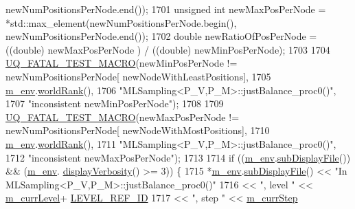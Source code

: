 \begin{DoxyCode}
      newNumPositionsPerNode.end());
1701     \textcolor{keywordtype}{unsigned} \textcolor{keywordtype}{int} newMaxPosPerNode = *std::max\_element(newNumPositionsPerNode.begin(), 
      newNumPositionsPerNode.end());
1702     \textcolor{keywordtype}{double} newRatioOfPosPerNode = ((double) newMaxPosPerNode ) / ((double) newMinPosPerNode);
1703 
1704     \hyperlink{_defines_8h_a56d63d18d0a6d45757de47fcc06f574d}{UQ\_FATAL\_TEST\_MACRO}(newMinPosPerNode != newNumPositionsPerNode[
      newNodeWithLeastPositions],
1705                         \hyperlink{class_q_u_e_s_o_1_1_m_l_sampling_a13f1ca4fe9f94822fe572a743eaced1d}{m\_env}.\hyperlink{class_q_u_e_s_o_1_1_base_environment_a78b57112bbd0e6dd0e8afec00b40ffa7}{worldRank}(),
1706                         \textcolor{stringliteral}{"MLSampling<P\_V,P\_M>::justBalance\_proc0()"},
1707                         \textcolor{stringliteral}{"inconsistent newMinPosPerNode"});
1708 
1709     \hyperlink{_defines_8h_a56d63d18d0a6d45757de47fcc06f574d}{UQ\_FATAL\_TEST\_MACRO}(newMaxPosPerNode != newNumPositionsPerNode[
      newNodeWithMostPositions],
1710                         \hyperlink{class_q_u_e_s_o_1_1_m_l_sampling_a13f1ca4fe9f94822fe572a743eaced1d}{m\_env}.\hyperlink{class_q_u_e_s_o_1_1_base_environment_a78b57112bbd0e6dd0e8afec00b40ffa7}{worldRank}(),
1711                         \textcolor{stringliteral}{"MLSampling<P\_V,P\_M>::justBalance\_proc0()"},
1712                         \textcolor{stringliteral}{"inconsistent newMaxPosPerNode"});
1713 
1714     \textcolor{keywordflow}{if} ((\hyperlink{class_q_u_e_s_o_1_1_m_l_sampling_a13f1ca4fe9f94822fe572a743eaced1d}{m\_env}.\hyperlink{class_q_u_e_s_o_1_1_base_environment_a8a0064746ae8dddfece4229b9ad374d6}{subDisplayFile}()) && (\hyperlink{class_q_u_e_s_o_1_1_m_l_sampling_a13f1ca4fe9f94822fe572a743eaced1d}{m\_env}.
      \hyperlink{class_q_u_e_s_o_1_1_base_environment_a1fe5f244fc0316a0ab3e37463f108b96}{displayVerbosity}() >= 3)) \{
1715       *\hyperlink{class_q_u_e_s_o_1_1_m_l_sampling_a13f1ca4fe9f94822fe572a743eaced1d}{m\_env}.\hyperlink{class_q_u_e_s_o_1_1_base_environment_a8a0064746ae8dddfece4229b9ad374d6}{subDisplayFile}() << \textcolor{stringliteral}{"In MLSampling<P\_V,P\_M>::justBalance\_proc0()"}
1716                               << \textcolor{stringliteral}{", level "} << \hyperlink{class_q_u_e_s_o_1_1_m_l_sampling_af9416874c856e50f3b35270e801f17e4}{m\_currLevel}+
      \hyperlink{_m_l_sampling_level_options_8h_a68d15eaf394d210effcf584b938206d3}{LEVEL\_REF\_ID}
1717                               << \textcolor{stringliteral}{", step "}  << \hyperlink{class_q_u_e_s_o_1_1_m_l_sampling_a1b1f8ccb4823bdfa26ec652f0807c63e}{m\_currStep}

\end{DoxyCode}
